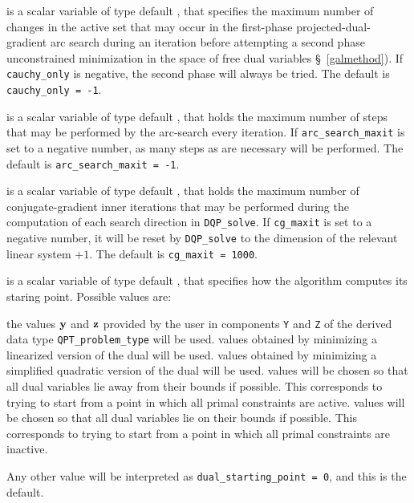 \begin{description}
 is a scalar variable of type default \integer, that specifies
the maximum number of changes in the active set that may occur in the
first-phase projected-dual-gradient arc search during an iteration before
attempting a second phase unconstrained minimization in the space of
free dual variables \S~\ref{galmethod}). If {\tt cauchy\_only} is negative,
the second phase will always be tried.
The default is {\tt cauchy\_only = -1}.

 is a scalar variable of type default \integer,
that holds the maximum number of steps that may be performed
by the arc-search every iteration.
If {\tt arc\_search\_maxit} is set to a negative number, as many steps
as are necessary will be performed.
The default is {\tt arc\_search\_maxit = -1}.

 is a scalar variable of type default \integer, that holds the
maximum number of conjugate-gradient inner iterations that may be performed
during the computation of each search direction in {\tt DQP\_solve}.
If {\tt cg\_maxit} is set to a negative number, it will be reset by
{\tt DQP\_solve} to the dimension of the relevant linear system $+ 1$.
The default is {\tt cg\_maxit = 1000}.

 is a scalar variable of type default \integer, that
specifies how the algorithm computes its staring point.
Possible values are:
\begin{description}
 the values ${\mathbf{y}}$ and ${\mathbf{z}}$
        provided by the user in components {\tt Y} and {\tt Z}
        of the derived data type {\tt QPT\_problem\_type} will be used.
 values obtained by minimizing a linearized version of the dual
        will be used.
 values obtained by minimizing a simplified quadratic version of
        the dual will be used.
 values will be chosen so that all dual variables lie away from
        their bounds if possible. This corresponds to trying to start
        from a point in which all primal constraints are active.
 values will be chosen so that all dual variables lie on
        their bounds if possible. This corresponds to trying to start
        from a point in which all primal constraints are inactive.
\end{description}
Any other value will be interpreted as {\tt dual\_starting\_point = 0},
and this is the default.



\end{description}
